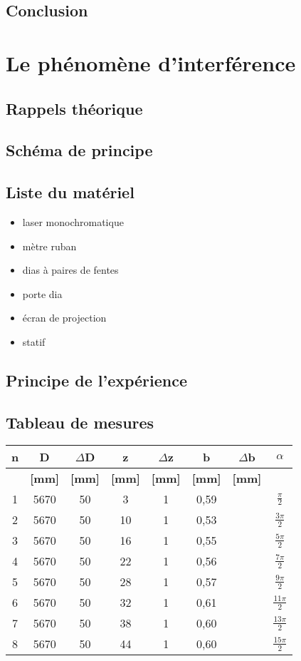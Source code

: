 \documentclass[11pt,a4paper]{report}
\begin{document}
	\section{Conclusion}
\chapter{Le phénomène d'interférence}
	\section{Rappels théorique}
	\section{Schéma de principe}
	\section{Liste du matériel}
	\begin{itemize}
	\item laser monochromatique
	\item mètre ruban
	\item dias à paires de fentes
	\item porte dia
	\item écran de projection
	\item statif
	\end{itemize}
	\section{Principe de l'expérience}
	\section{Tableau de mesures}
	\begin{tabular}{|c|c|c|c|c|c|c|c|}
		\hline
		\bf n & \bf D & \bf $\Delta$D & \bf z & \bf $\Delta$z & \bf b & \bf $\Delta$b & \bf $\alpha$ \\
		\hline
		 & \bf [mm] & \bf [mm] & \bf [mm] & \bf [mm] & \bf [mm]  & \bf [mm]  &  \\
		\hline
		1 & 5670 & 50 & 3 &   1&0,59&  & $\frac{\pi}{2}$\\
		2 & 5670 & 50 & 10 &  1&0,53&  & $\frac{3\pi}{2}$\\
		3 & 5670 & 50 & 16 &  1&0,55&  & $\frac{5\pi}{2}$\\
		4 & 5670 & 50 & 22 &  1&0,56&  & $\frac{7\pi}{2}$\\
		5 & 5670 & 50 & 28 &  1&0,57&  & $\frac{9\pi}{2}$\\
		6 & 5670 & 50 & 32 &  1&0,61&  & $\frac{11\pi}{2}$\\
		7 & 5670 & 50 & 38 &  1&0,60&  & $\frac{13\pi}{2}$\\
		8 & 5670 & 50 & 44 &  1&0,60 &  & $\frac{15\pi}{2}$\\
		\hline
	\end{tabular}
\end{document}
